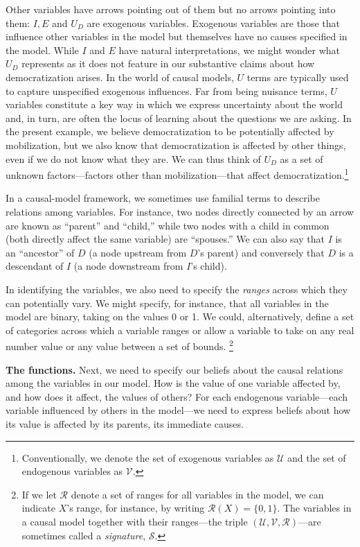 \documentclass[12pt,]{book}
\let\rmarkdownfootnote\footnote%
\def\footnote{\protect\rmarkdownfootnote}
\begin{document}
Other variables have arrows pointing out of them but no arrows pointing into them: \(I, E\) and \(U_D\) are exogenous variables. Exogenous variables are those that influence other variables in the model but themselves have no causes specified in the model. While \(I\) and \(E\) have natural interpretations, we might wonder what \(U_D\) represents as it does not feature in our substantive claims about how democratization arises. In the world of causal models, \(U\) terms are typically used to capture unspecified exogenous influences. Far from being nuisance terms, \(U\) variables constitute a key way in which we express uncertainty about the world and, in turn, are often the locus of learning about the questions we are asking. In the present example, we believe democratization to be potentially affected by mobilization, but we also know that democratization is affected by other things, even if we do not know what they are. We can thus think of \(U_D\) as a set of unknown factors---factors other than mobilization---that affect democratization.\footnote{Conventionally, we denote the set of exogenous variables as \(\mathcal{U}\) and the set of endogenous variables as \(\mathcal{V}\).}

In a causal-model framework, we sometimes use familial terms to describe relations among variables. For instance, two nodes directly connected by an arrow are known as ``parent'' and ``child,'' while two nodes with a child in common (both directly affect the same variable) are ``spouses.'' We can also say that \(I\) is an ``ancestor'' of \(D\) (a node upstream from \(D\)'s parent) and conversely that \(D\) is a descendant of \(I\) (a node downstream from \(I\)'s child).

In identifying the variables, we also need to specify the \emph{ranges} across which they can potentially vary. We might specify, for instance, that all variables in the model are binary, taking on the values 0 or 1. We could, alternatively, define a set of categories across which a variable ranges or allow a variable to take on any real number value or any value between a set of bounds. \footnote{If we let \(\mathcal{R}\) denote a set of ranges for all variables in the model, we can indicate \(X\)'s range, for instance, by writing \(\mathcal{R}(X)=\{0,1\}\). The variables in a causal model together with their ranges---the triple \((\mathcal{U}, \mathcal{V}, \mathcal{R})\)---are sometimes called a \emph{signature}, \(\mathcal{S}\).}

\textbf{The functions.} Next, we need to specify our beliefs about the causal relations among the variables in our model. How is the value of one variable affected by, and how does it affect, the values of others? For each endogenous variable---each variable influenced by others in the model---we need to express beliefs about how its value is affected by its parents, its immediate causes.
\end{document}

